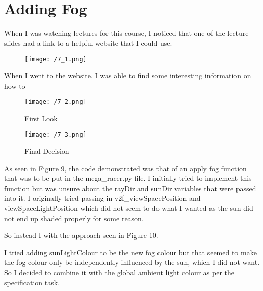 \documentclass[11pt, oneside, a4paper]{article}
\begin{document}
\section{Adding Fog}

When I was watching lectures for this course, I noticed that one of the lecture slides had a link to a helpful website that I could use. 

\begin{figure}[!ht]
	\centerline{\texttt{[image: /7\_1.png]}}
	\caption{}
	\label{fig:figure10}
\end{figure}

When I went to the website, I was able to find some interesting information on how to 

\begin{figure}[H]
    \centering
    \begin{minipage}{0.5\textwidth}
        \centering
        \texttt{[image: /7\_2.png]}
        \caption{First Look}
    \end{minipage}%
    \begin{minipage}{0.5\textwidth}
        \centering
        \texttt{[image: /7\_3.png]}
        \caption{Final Decision}
    \end{minipage}
\end{figure}

As seen in Figure 9, the code demonstrated was that of an apply fog function that was to be put in the mega_racer.py file. I initially tried to implement this function but was unsure about the rayDir and sunDir variables that were passed into it. I originally tried passing in v2f_viewSpacePosition and viewSpaceLightPosition which did not seem to do what I wanted as the sun did not end up shaded properly for some reason.

So instead I with the approach seen in Figure 10.

I tried adding sunLightColour to be the new fog colour but that seemed to make the fog colour only be independently influenced by the sun, which I did not want. So I decided to combine it with the global ambient light colour as per the specification task.
\end{document}
